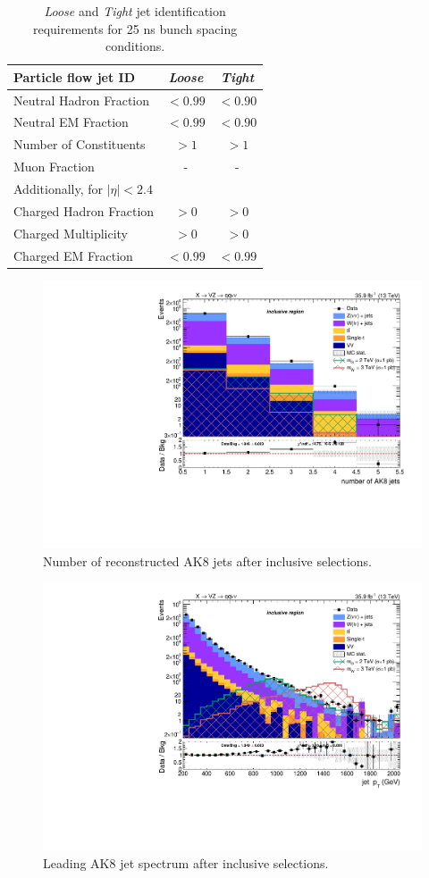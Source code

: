 \begin{table}[htb]
 \centering
 \caption{ \emph{Loose} and \emph{Tight} jet identification requirements for 25 ns bunch spacing conditions.\label{tab:JetId}}
 \begin{tabular}{l|cc}
Particle flow jet ID                       & \emph{Loose}   & \emph{Tight}   \\
\hline
 \hline
Neutral Hadron Fraction         & $< 0.99  $     & $< 0.90  $    \\
Neutral EM Fraction             & $< 0.99  $     & $< 0.90  $\\
Number of Constituents          & $> 1     $     & $> 1     $\\
Muon Fraction                   & \--            & \-- \\
\hline
\multicolumn{3}{l}{Additionally, for $|\eta| < 2.4$ } \\
\hline
Charged Hadron Fraction         & $> 0   $& $> 0   $\\
Charged Multiplicity            & $> 0   $& $> 0   $\\
Charged EM Fraction             & $< 0.99$& $< 0.99$\\
 \end{tabular}

\end{table}

\begin{figure}[!htb]
  \begin{center}
    \includegraphics[width=.495\textwidth]{plots/v9_thesis/XVZnnInc/nFatJets.pdf}
  \end{center}
  \caption{Number of reconstructed AK8 jets after inclusive selections.}
  \label{fig:n_AK8}
\end{figure}

\begin{figure}[!htb]
  \begin{center}
    \includegraphics[width=.495\textwidth]{plots/v9_thesis/XVZnnInc/FatJet1_pt.pdf}
  \end{center}
  \caption{Leading AK8 jet \pt spectrum after inclusive selections.}
  \label{fig:AK8jet_pt}
\end{figure}

